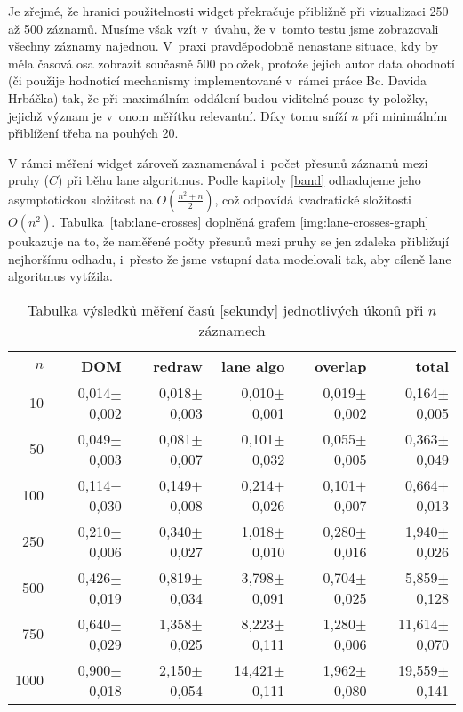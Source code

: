 		Je zřejmé, že hranici použitelnosti widget překračuje přibližně při vizualizaci 250 až 500 záznamů. Musíme však vzít v~úvahu, že v~tomto testu jsme zobrazovali všechny záznamy najednou. V~praxi pravděpodobně nenastane situace, kdy by měla časová osa zobrazit současně 500 položek, protože jejich autor data ohodnotí (či použije hodnoticí mechanismy implementované v~rámci práce Bc. Davida Hrbáčka) tak, že při maximálním oddálení budou viditelné pouze ty položky, jejichž význam je v~onom měřítku relevantní. Díky tomu sníží $n$ při minimálním přiblížení třeba na pouhých 20.
		
		V rámci měření widget zároveň zaznamenával i~počet přesunů záznamů mezi pruhy ($C$) při běhu lane algoritmus. Podle kapitoly \ref{band} odhadujeme jeho asymp\-totickou složitost na $O(\frac{n^2+n}{2})$, což odpovídá kvadratické složitosti $O(n^2)$. Tabulka~\ref{tab:lane-crosses} doplněná grafem \ref{img:lane-crosses-graph} poukazuje na to, že naměřené počty přesunů mezi pruhy se jen zdaleka přibližují nejhoršímu odhadu, i~přesto že jsme vstupní data modelovali tak, aby cíleně lane algoritmus vytížila.
		
		\begin{table}[h!]
			\small
			\begin{tabular}{|r|rrrrr|}
				\hline
				$n$ & DOM & redraw & lane algo & overlap & total\\
				\hline
				10 & 0,014$\pm$0,002 & 0,018$\pm$0,003 & 0,010$\pm$0,001 & 0,019$\pm$0,002 & 0,164$\pm$0,005\\
				50 & 0,049$\pm$0,003 & 0,081$\pm$0,007 & 0,101$\pm$0,032 & 0,055$\pm$0,005 & 0,363$\pm$0,049\\
				100 & 0,114$\pm$0,030 & 0,149$\pm$0,008 & 0,214$\pm$0,026 & 0,101$\pm$0,007 & 0,664$\pm$0,013\\
				250 & 0,210$\pm$0,006 & 0,340$\pm$0,027 & 1,018$\pm$0,010 & 0,280$\pm$0,016 & 1,940$\pm$0,026\\
				500 & 0,426$\pm$0,019 & 0,819$\pm$0,034 & 3,798$\pm$0,091 & 0,704$\pm$0,025 & 5,859$\pm$0,128\\
				750 & 0,640$\pm$0,029 & 1,358$\pm$0,025 & 8,223$\pm$0,111 & 1,280$\pm$0,006 & 11,614$\pm$0,070\\
				1000 & 0,900$\pm$0,018 & 2,150$\pm$0,054 & 14,421$\pm$0,111 & 1,962$\pm$0,080 & 19,559$\pm$0,141\\
				\hline
			\end{tabular}
			\caption{Tabulka výsledků měření časů [sekundy] jednotlivých úkonů při $n$ záznamech}
			\label{tab:redraw-times}
		\end{table}
		
